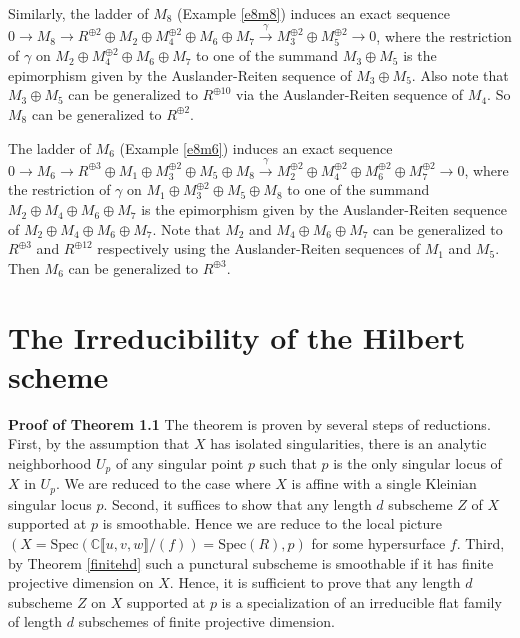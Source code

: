 \documentclass{amsart}[12pt]
\theoremstyle{definition}
\theoremstyle{remark}
\numberwithin{equation}{section}
\begin{document}
Similarly, the ladder of $M_8$ (Example \ref{e8m8}) induces an exact sequence $0 \to M_8 \to R^{\oplus 2} \oplus M_2 \oplus M_4^{\oplus 2} \oplus M_6 \oplus M_7 \xrightarrow{\gamma} M_3^{\oplus 2} \oplus M_5^{\oplus 2} \to 0$, where the restriction of $\gamma$ on $M_2 \oplus M_4^{\oplus 2} \oplus M_6 \oplus M_7 $ to one of the summand $M_3 \oplus M_5$ is the epimorphism given by the Auslander-Reiten sequence of $M_3 \oplus M_5$. Also note that $M_3 \oplus M_5$ can be generalized to $R^{\oplus 10}$ via the Auslander-Reiten sequence of $M_4$. So $M_8$ can be generalized to $R^{\oplus 2}$. 

The ladder of $M_6$ (Example \ref{e8m6}) induces an exact sequence $0 \to M_6 \to R^{\oplus 3} \oplus M_1 \oplus M_3^{\oplus 2} \oplus M_5 \oplus M_8 \xrightarrow{\gamma} M_2^{\oplus 2} \oplus M_4^{\oplus 2} \oplus M_6^{\oplus 2} \oplus M_7^{\oplus 2} \to 0$, where the restriction of $\gamma$ on $M_1 \oplus M_3^{\oplus 2} \oplus M_5 \oplus M_8$ to one of the summand $M_2 \oplus M_4 \oplus M_6 \oplus M_7$ is the epimorphism given by the Auslander-Reiten sequence of $M_2 \oplus M_4 \oplus M_6 \oplus M_7$. Note that $M_2$ and $M_4 \oplus M_6 \oplus M_7$ can be generalized to $R^{\oplus 3}$ and $R^{\oplus 12}$ respectively using the Auslander-Reiten sequences of $M_1$ and $M_5$. Then $M_6$ can be generalized to $R^{\oplus 3}$. 

\section{The Irreducibility of the Hilbert scheme}

\textbf{Proof of Theorem 1.1}
The theorem is proven by several steps of reductions. First, by the assumption that $X$ has isolated singularities, there is an analytic neighborhood $U_p$ of any singular point $p$ such that $p$ is the only singular locus of $X$ in $U_p$. We are reduced to the case where $X$ is affine with a single Kleinian singular locus $p$. Second, it suffices to show that any length $d$ subscheme $Z$ of $X$ supported at $p$ is smoothable. Hence we are reduce to the local picture $(X = \mathrm{Spec}(\mathbb{C}\llbracket u, v, w\rrbracket /(f)) = \mathrm{Spec}(R), p)$ for some hypersurface $f$. Third, by Theorem \ref{finitehd} such a punctural subscheme is smoothable if it has finite projective dimension on $X$. Hence, it is sufficient to prove that any length $d$ subscheme $Z$ on $X$ supported at $p$ is a specialization of an irreducible flat family of length $d$ subschemes of finite projective dimension.
\end{document}
